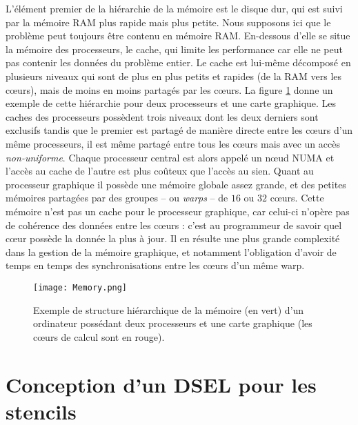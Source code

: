 L'élément premier de la hiérarchie de la mémoire est le disque dur, qui est suivi par la mémoire RAM plus rapide mais plus petite. Nous supposons ici que le problème peut toujours être contenu en mémoire RAM. En-dessous d'elle se situe la mémoire des processeurs, le cache, qui limite les performance car elle ne peut pas contenir les données du problème entier. Le cache est lui-même décomposé en plusieurs niveaux qui sont de plus en plus petits et rapides (de la RAM vers les cœurs), mais de moins en moins partagés par les cœurs. La figure \ref{fig:memoire_base} donne un exemple de cette hiérarchie pour deux processeurs et une carte graphique. Les caches des processeurs possèdent trois niveaux dont les deux derniers sont exclusifs tandis que le premier est partagé de manière directe entre les cœurs d'un même processeurs, il est même partagé entre tous les cœurs mais avec un accès \emph{non-uniforme}. Chaque processeur central est alors appelé un nœud NUMA et l'accès au cache de l'autre est plus coûteux que l'accès au sien. Quant au processeur graphique il possède une mémoire globale assez grande, et des petites mémoires partagées par des groupes -- ou \emph{warps} -- de $16$ ou $32$ cœurs. Cette mémoire n'est pas un cache pour le processeur graphique, car celui-ci n'opère pas de cohérence des données entre les cœurs : c'est au programmeur de savoir quel cœur possède la donnée la plus à jour. Il en résulte une plus grande complexité dans la gestion de la mémoire graphique, et notamment l'obligation d'avoir de temps en temps des synchronisations entre les cœurs d'un même warp. 

\begin{figure}[!h]
  \caption{Exemple de structure hiérarchique de la mémoire (en vert) d'un ordinateur possédant deux processeurs et une carte graphique (les cœurs de calcul sont en rouge).}
  \label{fig:memoire_base}
  \texttt{[image: Memory.png]}
\end{figure}


\section{Conception d'un DSEL pour les stencils}

